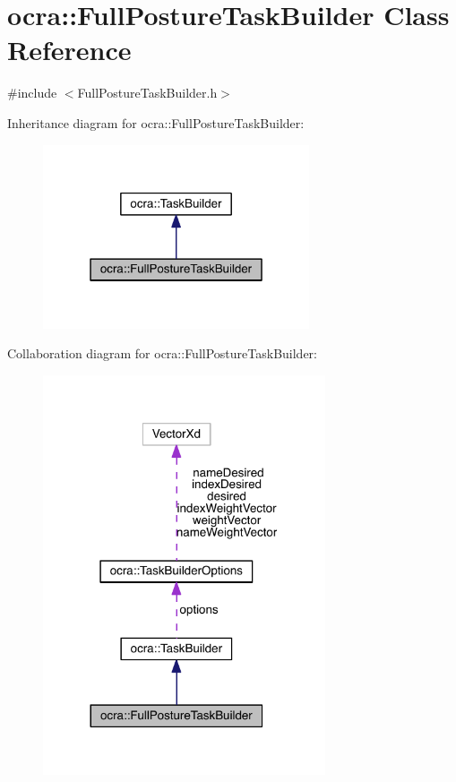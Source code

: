 \hypertarget{classocra_1_1FullPostureTaskBuilder}{}\section{ocra\+:\+:Full\+Posture\+Task\+Builder Class Reference}
\label{classocra_1_1FullPostureTaskBuilder}


{\ttfamily \#include $<$Full\+Posture\+Task\+Builder.\+h$>$}



Inheritance diagram for ocra\+:\+:Full\+Posture\+Task\+Builder\+:\nopagebreak
\begin{figure}[H]
\begin{center}
\leavevmode
\includegraphics[width=223pt]{d1/d16/classocra_1_1FullPostureTaskBuilder__inherit__graph}
\end{center}
\end{figure}


Collaboration diagram for ocra\+:\+:Full\+Posture\+Task\+Builder\+:\nopagebreak
\begin{figure}[H]
\begin{center}
\leavevmode
\includegraphics[width=236pt]{d6/d2e/classocra_1_1FullPostureTaskBuilder__coll__graph}
\end{center}
\end{figure}
